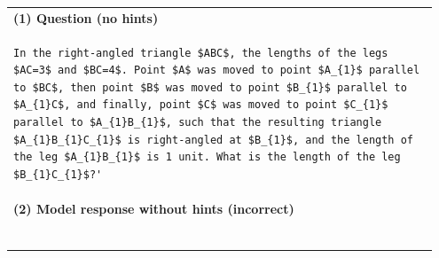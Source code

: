 \documentclass{article}
\begin{document}
{\begin{table}[H]
\begin{tabular}{|p{0.95\linewidth}|}
\textbf{(1) Question (no hints)}\\[-0.2em]
\begin{Verbatim}[fontsize=\scriptsize,breaklines=true]
In the right-angled triangle $ABC$, the lengths of the legs $AC=3$ and $BC=4$. Point $A$ was moved to point $A_{1}$ parallel to $BC$, then point $B$ was moved to point $B_{1}$ parallel to $A_{1}C$, and finally, point $C$ was moved to point $C_{1}$ parallel to $A_{1}B_{1}$, such that the resulting triangle $A_{1}B_{1}C_{1}$ is right-angled at $B_{1}$, and the length of the leg $A_{1}B_{1}$ is 1 unit. What is the length of the leg $B_{1}C_{1}$?'
\end{Verbatim}
\\ \hline
\textbf{(2) Model response without hints (incorrect)}\\[-0.2em]
\begin{Verbatim}[fontsize=\scriptsize,breaklines=true]

\end{Verbatim}
\end{tabular}
\end{table}}
\end{document}
